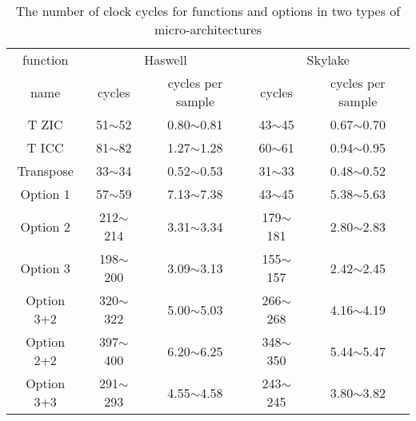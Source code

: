 \begin{table}[t]
    \caption{The number of clock cycles for functions and options in two types of micro-architectures}  %
    \centering %
    \setlength{\tabcolsep}{1.6pt}
    \begin{tabular}{c|c|c|c|c} %
    \hline\hline %
    function & \multicolumn{2}{c|}{Haswell} & \multicolumn{2}{c}{Skylake} \\ [0.3ex]
    \cline{2-5}
    name & cycles & cycles per sample & cycles & cycles per sample \\ [0.3ex] %
    \hline
    T ZIC & 51$\sim$52 & 0.80$\sim$0.81 & 43$\sim$45 & 0.67$\sim$0.70 \\ [0.3ex]
    T ICC & 81$\sim$82 & 1.27$\sim$1.28 & 60$\sim$61 & 0.94$\sim$0.95 \\ [0.3ex]
    Transpose & 33$\sim$34 & 0.52$\sim$0.53 & 31$\sim$33 & 0.48$\sim$0.52 \\ [0.3ex]
    Option 1 & 57$\sim$59 & 7.13$\sim$7.38 & 43$\sim$45 & 5.38$\sim$5.63 \\ [0.3ex]
    Option 2 & 212$\sim$214 & 3.31$\sim$3.34 & 179$\sim$181 & 2.80$\sim$2.83 \\ [0.3ex]
    Option 3 & 198$\sim$200 & 3.09$\sim$3.13 & 155$\sim$157 & 2.42$\sim$2.45 \\ [0.3ex]
    Option 3+2 & 320$\sim$322 & 5.00$\sim$5.03 & 266$\sim$268 & 4.16$\sim$4.19 \\ [0.3ex]
    Option 2+2 & 397$\sim$400 & 6.20$\sim$6.25 & 348$\sim$350 & 5.44$\sim$5.47 \\ [0.3ex]
    Option 3+3 & 291$\sim$293 & 4.55$\sim$4.58 & 243$\sim$245 & 3.80$\sim$3.82 \\ [1ex]
    \hline
    \end{tabular}
    \label{table:number_of_instructions_in_clock_cycles} %
\end{table}



